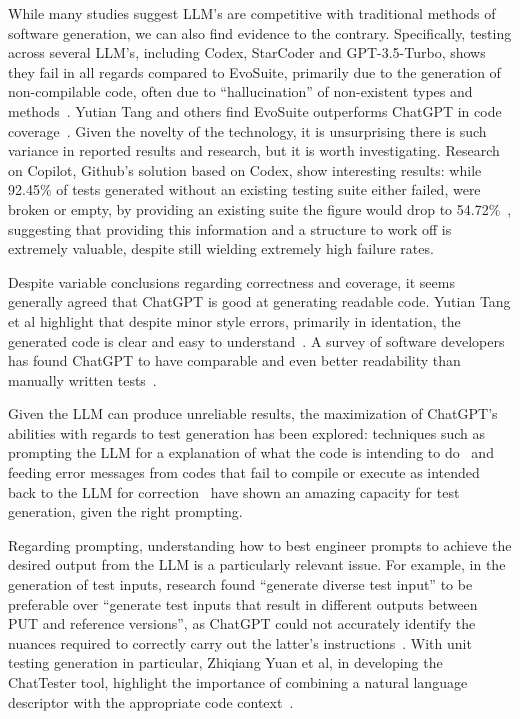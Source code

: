 While many studies suggest LLM's are competitive with traditional methods of software generation, we can also find evidence to the contrary. Specifically, testing across several LLM's, including Codex, StarCoder and GPT-3.5-Turbo, shows they fail in all regards compared to EvoSuite, primarily due to the generation of non-compilable code, often due to ``hallucination'' of non-existent types and methods~\cite{kn:siddiq2023empirical}. Yutian Tang and others find EvoSuite outperforms ChatGPT in code coverage~\cite{kn:tang2023chatgpt}. Given the novelty of the technology, it is unsurprising there is such variance in reported results and research, but it is worth investigating. Research on Copilot, Github's solution based on Codex, show interesting results: while 92.45\% of tests generated without an existing testing suite either failed, were broken or empty, by providing an existing suite the figure would drop to 54.72\%~\cite{kn:githubcopilot}, suggesting that providing this information and a structure to work off is extremely valuable, despite still wielding extremely high failure rates.

Despite variable conclusions regarding correctness and coverage, it seems generally agreed that ChatGPT is good at generating readable code. Yutian Tang et al highlight that despite minor style errors, primarily in identation, the generated code is clear and easy to understand~\cite{kn:tang2023chatgpt}. A survey of software developers has found ChatGPT to have comparable and even better readability than manually written tests~\cite{kn:chattester}.


Given the LLM can produce unreliable results, the maximization of ChatGPT's abilities with regards to test generation has been explored: techniques such as prompting the LLM for a explanation of what the code is intending to do~\cite{kn:nuances} and feeding error messages from codes that fail to compile or execute as intended back to the LLM for correction~\cite{kn:chattester} have shown an amazing capacity for test generation, given the right prompting.

Regarding prompting, understanding how to best engineer prompts to achieve the desired output from the LLM is a particularly relevant issue. For example, in the generation of test inputs, research found ``generate diverse test input'' to be preferable over ``generate test inputs that result in different outputs between PUT and reference versions'', as ChatGPT could not accurately identify the nuances required to correctly carry out the latter's instructions~\cite{kn:nuances}.
With unit testing generation in particular, Zhiqiang Yuan et al, in developing the ChatTester tool, highlight the importance of combining a natural language descriptor with the appropriate code context~\cite{kn:chattester}.

